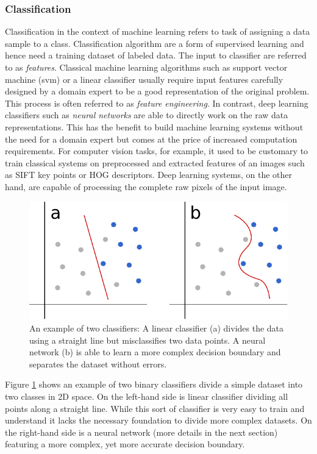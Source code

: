 \subsubsection{Classification}
Classification in the context of machine learning refers to task of assigning a data sample to a class. Classification algorithm are a form of supervised learning and hence need a training dataset of labeled data. The input to classifier are referred to as \textit{features}. Classical machine learning algorithms such as support vector machine (\ac{svm}) or a linear classifier usually require input features carefully designed by a domain expert to be a good representation of the original problem. This process is often referred to as \textit{feature engineering}. In contrast, deep learning classifiers such as \textit{neural networks} are able to directly work on the raw data representations. This has the benefit to build machine learning systems without the need for a domain expert but comes at the price of increased computation requirements. For computer vision tasks, for example, it used to be customary to train classical systems on preprocessed and extracted features of an images such as SIFT key points\cite{lowe1999object} or HOG descriptors\cite{dalal2005histograms}. Deep learning systems, on the other hand, are capable of processing the complete raw pixels of the input image.

	\begin{figure}[]
  		\centering
    	\includegraphics[width=\textwidth, keepaspectratio]{img/classifiers.pdf}
    	\caption{An example of two classifiers: A linear classifier (a) divides the data using a straight line but misclassifies two data points. A neural network (b) is able to learn a more complex decision boundary and separates the dataset without errors.}
    	\label{fig:classifiers}
	\end{figure}

Figure \ref{fig:classifiers} shows an example of two binary classifiers divide a simple dataset into two classes in 2D space. On the left-hand side is linear classifier dividing all points along a straight line. While this sort of classifier is very easy to train and understand it lacks the necessary foundation to divide more complex datasets. On the right-hand side is a neural network (more details in the next section) featuring a more complex, yet more accurate decision boundary. 

